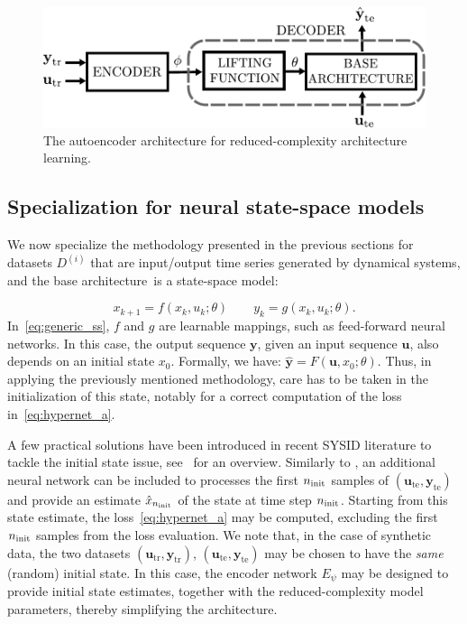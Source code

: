 \documentclass{article}
\newcommand{\base}{{base architecture}}
\newcommand{\ii}{{(i)}}
\newcommand{\tr}{\mathrm{tr}}
\newcommand{\te}{\mathrm{te}}
\newcommand{\seq}[1]{{\mathbf{#1}}}
\newcommand{\D}{D}
\begin{document}
\begin{figure}
\begin{center}
\includegraphics[width=.6\hsize]{img/ae_archi.pdf}
\caption{The autoencoder architecture for reduced-complexity architecture learning.}
\label{fig:encdec_hypernet}
\end{center}
\end{figure}

\subsection{Specialization for neural state-space models}
We now specialize the methodology presented in the previous sections for datasets $\D^\ii$ that are input/output time series generated by dynamical systems, and the \base\ is a state-space model:

\begin{equation}
\label{eq:generic_ss}
    x_{k+1} = f(x_k, u_k; \theta) \qquad
    y_{k} = g(x_k, u_k; \theta).
\end{equation}
In~\eqref{eq:generic_ss}, $f$ and $g$ are learnable mappings, such as feed-forward neural networks.
In this case, the output sequence $\seq y$, given an input sequence $\seq u$, also depends on an initial state $x_0$. Formally, we have: $\hat {\seq y} = F(\seq u, x_0; \theta)$.
Thus, in applying the previously mentioned methodology, care has to be taken in the initialization of this state, notably for a correct computation of the loss in~\eqref{eq:hypernet_a}.

A few practical solutions have been introduced in recent SYSID literature to tackle the initial state issue, see~\cite{forgione2022learning} for an overview. Similarly to \cite{masti2021learning,beintema2023deep,Bem25}, an additional neural network can be included to processes the first $n_{\rm init}$ samples of $(\seq u_\te , \seq y_\te )$ and provide an estimate $\hat x_{n_{\rm init}}$ of the state at time step $n_{\rm init}$. Starting from this state estimate, the loss~\eqref{eq:hypernet_a} may be computed, excluding the first $n_{\rm init}$ samples from the loss evaluation. We note that, in the case of synthetic data, the two datasets $(\seq u_\tr , \seq y_\tr )$, $(\seq u_\te , \seq y_\te )$ may be chosen to have the \emph{same} (random) initial state. In this case, the encoder network $E_\psi$ may be designed to provide initial state estimates, together with the reduced-complexity model parameters, thereby simplifying the architecture. 
\end{document}
